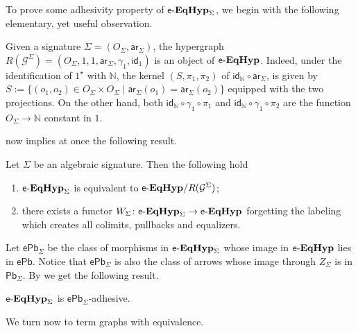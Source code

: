 \documentclass[3p]{elsarticle}
\newcommand{\pbc}{\mathsf{Pb}}
\newcommand{\pbe}{\mathsf{ePb}}
\newcommand{\eg}[0]{\mathbf{EGG}}
\newcommand{\catname}[1]{\textbf{\textup{#1}}}
\newcommand{\EqTG}{\catname{EqTG}}
\newcommand{\egg}{\mathsf{e}\text{-}\catname{EqHyp}}
\newcommand{\ari}{\mathsf{ar}}
\newcommand{\id}[1]{\mathsf{id}_{#1}}
\theoremstyle{remark}
\theoremstyle{definition}
\begin{document}
To prove some adhesivity property of $\egg_\Sigma$, we begin with the following elementary, yet useful observation.

\begin{rem}\label{rem:algegg}
	Given a signature $\Sigma = (O_\Sigma, \ari_\Sigma)$,
	the hypergraph 
	$R(\mathcal{G}^\Sigma) = (O_\Sigma, 1, 1, \ari_\Sigma, \gamma_1, \id{1})$
	is an object of $\egg$.
	Indeed, under the identification of $1^\star$ with $\mathbb{N}$, the kernel $(S, \pi_1, \pi_2)$  of $\id{\mathbb{N}} \circ \ari_\Sigma$, is given by
	$S:=\{(o_1, o_2)\in O_\Sigma \times O_\Sigma \mid \ari_\Sigma(o_1)=\ari_\Sigma(o_2)\}$
	equipped with the two projections.  On the other hand, both $\id{\mathbb{N}} \circ \gamma_1 \circ \pi_1$ and $\id{\mathbb{N}}\circ \gamma_1 \circ \pi_2$ are the function $O_\Sigma \to \mathbb{N}$ constant in $1$.
\end{rem}

 now implies at once the following result.

\begin{prop}\label{prop:varie}
	Let $\Sigma$ be an algebraic signature. Then the following hold
	\begin{enumerate}
		\item $\egg_\Sigma$ is equivalent to $\egg/R(\mathcal{G}^\Sigma)$;
		\item there exists a functor $W_\Sigma \colon \egg_\Sigma\to \egg$ forgetting the labeling which creates all colimits, pullbacks and equalizers. 
	\end{enumerate}
\end{prop}

Let $\pbe_\Sigma$ be the class of morphisms in $\egg_\Sigma$ whose image in $\egg$ lies in $\pbe$. Notice that $\pbe_\Sigma$ is also the class of arrows whose image through $Z_\Sigma$ is in $\pbc_\Sigma$.
%
By  we get the following result.

\begin{cor}\label{cor:eggade1}
	$\egg_\Sigma$ is $\pbe_\Sigma$-adhesive.
\end{cor}

We turn now to term graphs with equivalence.

\end{document}
